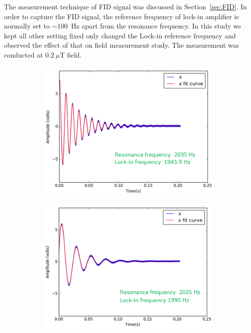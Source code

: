 The measurement technique of FID signal was discussed in
Section~\ref{sec:FID}.  In order to capture the FID signal, the
reference frequency of lock-in amplifier is normally set to $\sim
100$~Hz apart from the resonance frequency. In this study we kept all
other setting fixed only changed the Lock-in reference frequency and
observed the effect of that on field measurement study. The
measurement was conducted at $0.2~\mu$T field.
   \begin{figure}
    \centering
    \begin{subfigure}[b]{0.4\textwidth}
        \centering
        \includegraphics[width=\textwidth]{figures/reference_frequency1}
        \caption{}
        \label{fig:far from resonance}
    \end{subfigure}
    \hfill
    \begin{subfigure}[b]{0.4\textwidth}
        \centering
        \includegraphics[width=\textwidth]{figures/reference_frequency3}

\end{subfigure}
\end{figure}
